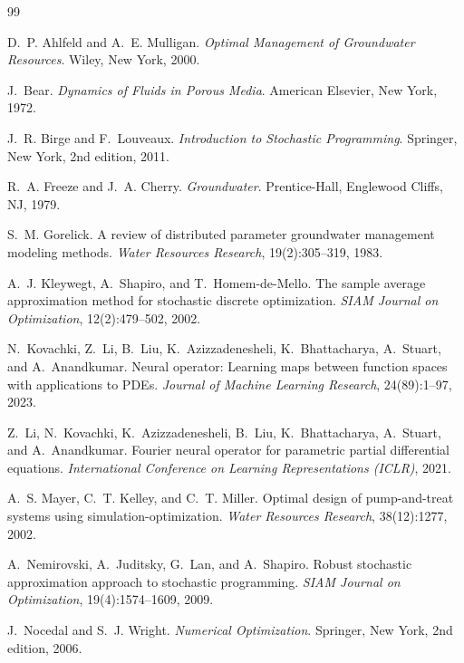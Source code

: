\documentclass[11pt]{article}
\numberwithin{equation}{section}
\theoremstyle{plain}
\begin{document}

\begin{thebibliography}{99}

D.~P. Ahlfeld and A.~E. Mulligan.
\textit{Optimal Management of Groundwater Resources}.
Wiley, New York, 2000.

J.~Bear.
\textit{Dynamics of Fluids in Porous Media}.
American Elsevier, New York, 1972.

J.~R. Birge and F.~Louveaux.
\textit{Introduction to Stochastic Programming}.
Springer, New York, 2nd edition, 2011.

R.~A. Freeze and J.~A. Cherry.
\textit{Groundwater}.
Prentice-Hall, Englewood Cliffs, NJ, 1979.

S.~M. Gorelick.
A review of distributed parameter groundwater management modeling methods.
\textit{Water Resources Research}, 19(2):305--319, 1983.

A.~J. Kleywegt, A.~Shapiro, and T.~Homem-de-Mello.
The sample average approximation method for stochastic discrete optimization.
\textit{SIAM Journal on Optimization}, 12(2):479--502, 2002.

N.~Kovachki, Z.~Li, B.~Liu, K.~Azizzadenesheli, K.~Bhattacharya, A.~Stuart,
and A.~Anandkumar.
Neural operator: Learning maps between function spaces with applications to
PDEs.
\textit{Journal of Machine Learning Research}, 24(89):1--97, 2023.

Z.~Li, N.~Kovachki, K.~Azizzadenesheli, B.~Liu, K.~Bhattacharya, A.~Stuart,
and A.~Anandkumar.
Fourier neural operator for parametric partial differential equations.
\textit{International Conference on Learning Representations (ICLR)}, 2021.

A.~S. Mayer, C.~T. Kelley, and C.~T. Miller.
Optimal design of pump-and-treat systems using simulation-optimization.
\textit{Water Resources Research}, 38(12):1277, 2002.

A.~Nemirovski, A.~Juditsky, G.~Lan, and A.~Shapiro.
Robust stochastic approximation approach to stochastic programming.
\textit{SIAM Journal on Optimization}, 19(4):1574--1609, 2009.

J.~Nocedal and S.~J. Wright.
\textit{Numerical Optimization}.
Springer, New York, 2nd edition, 2006.


\end{thebibliography}
\end{document}
